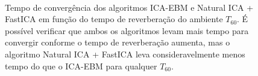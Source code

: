        
\begin{figure}
    \centering
    \\
    \caption{Tempo de convergência dos algoritmos ICA-EBM e Natural ICA + FastICA em função do tempo de reverberação do ambiente $T_{60}$. É possível verificar que ambos os algoritmos levam mais tempo para convergir conforme o tempo de reverberação aumenta, mas o algoritmo Natural ICA + FastICA leva consideravelmente menos tempo do que o ICA-EBM para qualquer $T_{60}$.}
    \label{fig:naticareverb}
\end{figure}




